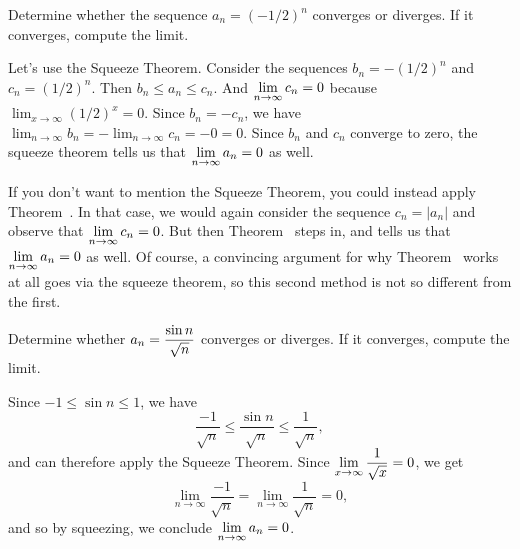 \begin{example}
Determine whether the sequence $a_n = (-1/2)^n$ converges or
diverges. If it converges, compute the limit.
\end{example}


\begin{solution}
  Let's use the Squeeze Theorem.  Consider the sequences $b_n =
  -(1/2)^n$ and $c_n = (1/2)^n$.  Then $b_n \leq a_n \leq c_n$.  And
  $\displaystyle\lim_{n \to \infty} c_n = 0$ because $\lim_{x \to \infty}
  (1/2)^x = 0$.  Since $b_n = - c_n$, we have $\lim_{n \to \infty} b_n
  = - \lim_{n \to \infty} c_n = -0 = 0$.  Since $b_n$ and $c_n$
  converge to zero, the squeeze theorem tells us that $\displaystyle\lim_{n \to
    \infty} a_n = 0$ as well.

  If you don't want to mention the Squeeze Theorem, you could instead
  apply Theorem~.  In that case, we
  would again consider the sequence $c_n = |a_n|$ and observe that
  $\displaystyle\lim_{n \to \infty} c_n = 0$.  But then
  Theorem~ steps in, and tells us
  that $\displaystyle\lim_{n \to \infty} a_n = 0$ as well.  Of course, a
  convincing argument for why Theorem~ works at all goes via the squeeze theorem, so this
  second method is not so different from the first.
\end{solution}

\begin{example}
Determine whether $a_n = \displaystyle\frac{\sin n}{\sqrt{n}}$ converges or
diverges. If it converges, compute the limit. 
\end{example}

\begin{solution}
Since $-1 \leq \sin n \leq 1$, we have 
$$
\frac{-1}{\sqrt{n}} \leq \frac{\sin n}{\sqrt{n}} \leq \frac{1}{\sqrt{n}},
$$ 
and can therefore apply the Squeeze Theorem.  Since $\displaystyle\lim_{x \to \infty} \frac{1}{\sqrt{x}} = 0$, we get
$$
\lim_{n \to \infty} \frac{-1}{\sqrt{n}} = \lim_{n \to \infty} \frac{1}{\sqrt{n}} = 0,
$$
and so by squeezing, we conclude $\displaystyle\lim_{n \to \infty} a_n = 0$.
\end{solution}


